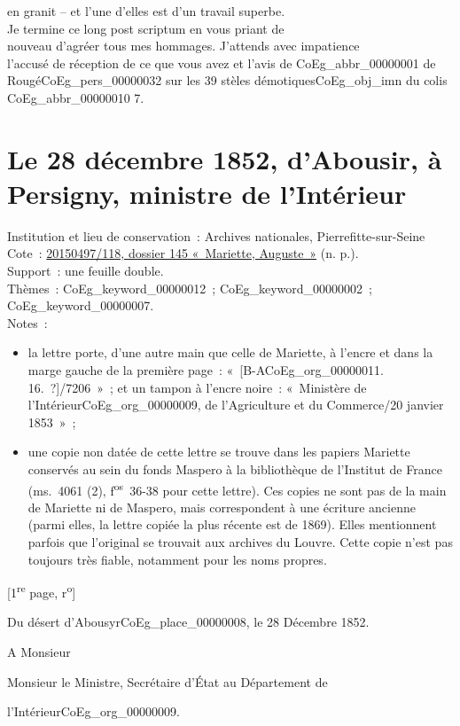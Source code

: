 \documentclass{book}
\begin{document}
en granit – et l’une d’elles est d’un travail superbe.\\
\indent Je termine ce long post scriptum en vous priant de\\
nouveau d’agréer tous mes hommages. J’attends avec impatience\\
l’accusé de réception de ce que vous avez et l’avis de \gls{CoEg_abbr_00000001} de\\
Rougé\gls{CoEg_pers_00000032} sur les 39 stèles démotiques\gls{CoEg_obj_imn} du colis \gls{CoEg_abbr_00000010} 7.

\hypertarget{CoEg_Mariette_1852-12-28}{}
\section*{Le 28 décembre 1852, d’Abousir, à Persigny, ministre de l'Intérieur}
{\footnotesize
\noindent Institution et lieu de conservation~: Archives nationales, Pierrefitte-sur-Seine\\
Cote~: \hyperlink{CoEg_Mariette_ms_001}{20150497/118, dossier 145 «~Mariette, Auguste~»} (n. p.).\\
Support~: une feuille double.\\
Thèmes~: \gls{CoEg_keyword_00000012}~; \gls{CoEg_keyword_00000002}~; \gls{CoEg_keyword_00000007}.\\
Notes~: \begin{itemize} \item la lettre porte, d’une autre main que celle de Mariette, à l’encre et dans la marge gauche de la première page~: «~[B-A\gls{CoEg_org_00000011}. 16.~?]/7206~»~; et un tampon à l’encre noire~: «~Ministère de l’Intérieur\gls{CoEg_org_00000009}, de l’Agriculture et du Commerce/20 janvier 1853~»~; \item une copie non datée de cette lettre se trouve dans les papiers Mariette conservés au sein du fonds Maspero à la bibliothèque de l’Institut de France (ms.~4061 (2), f\textsuperscript{os}~36-38 pour cette lettre). Ces copies ne sont pas de la main de Mariette ni de Maspero, mais correspondent à une écriture ancienne (parmi elles, la lettre copiée la plus récente est de 1869). Elles mentionnent parfois que l’original se trouvait aux archives du Louvre. Cette copie n’est pas toujours très fiable, notamment pour les noms propres.\end{itemize}
\begin{center} {[1\textsuperscript{re} page, r\textsuperscript{o}]}\end{center}}
\begin{flushright} Du désert d’Abousyr\gls{CoEg_place_00000008}, le 28 Décembre 1852.\end{flushright}
\indent A Monsieur
\begin{center}Monsieur le Ministre, Secrétaire d’État au Département de\end{center}
\begin{flushright}l’Intérieur\gls{CoEg_org_00000009}.\end{flushright}
\end{document}
